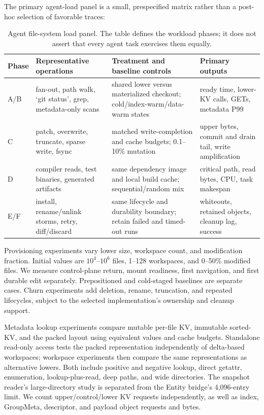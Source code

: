 The primary agent-load panel is a small, prespecified matrix rather than a
post-hoc selection of favorable traces:

\begin{table}[t]
\centering
\scriptsize
\begin{tabularx}{\textwidth}{@{}p{1.1cm}p{3.3cm}Yp{2.0cm}@{}}
\toprule
Phase & Representative operations & Treatment and baseline controls & Primary outputs\\
\midrule
A/B & fan-out, path walk, `git status', grep, metadata-only scans &
shared lower versus materialized checkout; cold/index-warm/data-warm states &
ready time, lower-KV calls, GETs, metadata P99\\
C & patch, overwrite, truncate, sparse write, fsync &
matched write-completion and cache budgets; 0.1--10\% mutation &
upper bytes, commit and drain tail, write amplification\\
D & compiler reads, test binaries, generated artifacts &
same dependency image and local build cache; sequential/random mix &
critical path, read bytes, CPU, task makespan\\
E/F & install, rename/unlink storms, retry, diff/discard &
same lifecycle and durability boundary; retain failed and timed-out runs &
whiteouts, retained objects, cleanup lag, success\\
\bottomrule
\end{tabularx}
\caption{Agent file-system load panel. The table defines the workload
phases; it does not assert that every agent task exercises them equally.}
\label{tab:agent-load}
\end{table}

 Provisioning experiments vary lower size, workspace count, and
modification fraction. Initial values are $10^4$--$10^6$ files, 1--128
workspaces, and 0--50\% modified files. We measure control-plane return,
mount readiness, first navigation, and first durable edit separately.
Prepositioned and cold-staged baselines are separate cases. Churn experiments
add deletion, rename, truncation, and repeated lifecycles, subject to the
selected implementation's ownership and cleanup support.

 Metadata lookup experiments compare mutable per-file KV,
immutable sorted-KV, and the packed layout using equivalent values and
cache budgets. Standalone read-only access tests the packed representation
independently of delta-based workspaces; workspace experiments then compare
the same representations as alternative lowers. Both include positive and
negative lookup, direct getattr, enumeration,
lookup-plus-read, deep paths, and wide directories. The snapshot reader's
large-directory study is separated from the Entity bridge's 4,096-entry
limit. We count upper/control/lower KV requests independently, as well as
index, GroupMeta, descriptor, and payload object requests and bytes.

